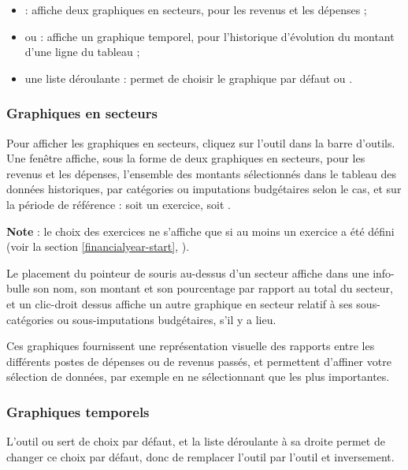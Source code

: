 \begin{itemize}
	 \item {} : affiche deux graphiques en secteurs, pour les revenus et les dépenses ;
	 \item {} ou  : affiche un graphique temporel, pour l'historique d'évolution du montant d'une ligne du tableau ;
	 \item une liste déroulante : permet de choisir le graphique par défaut  ou .
\end{itemize}


\subsubsection{Graphiques en secteurs}

Pour afficher les graphiques en secteurs, cliquez sur l'outil  dans la barre d'outils. Une fenêtre affiche, sous la forme de deux graphiques en secteurs, pour les revenus et les dépenses, l'ensemble des montants sélectionnés dans le tableau des données historiques, par catégories ou imputations budgétaires selon le cas, et sur la période de référence : soit un exercice, soit .

\textbf{Note} : le choix des exercices ne s'affiche que si au moins un exercice a été défini (voir la section \vref{financialyear-start}, ).

Le placement du pointeur de souris au-dessus d'un secteur affiche dans une info-bulle son nom, son montant et son pourcentage par rapport au total du secteur, et un clic-droit dessus affiche un autre graphique en secteur relatif à ses sous-catégories ou sous-imputations budgétaires, s'il y a lieu.

Ces graphiques fournissent une représentation visuelle des rapports entre les différents postes de dépenses ou de revenus passés, et permettent d'affiner votre sélection de données, par exemple en ne sélectionnant que les plus importantes.


\subsubsection{Graphiques temporels}

L'outil  ou  sert de choix par défaut, et la liste déroulante à sa droite permet de changer ce choix par défaut, donc de remplacer l'outil  par l'outil  et inversement.

